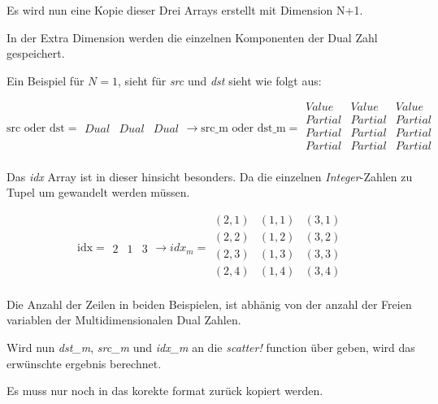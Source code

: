 Es wird nun eine Kopie dieser Drei Arrays erstellt mit Dimension N+1.

In der Extra Dimension werden die einzelnen Komponenten der Dual Zahl gespeichert.

Ein Beispiel für $N = 1$, sieht für \textit{src} und \textit{dst} sieht wie folgt aus:

$$

\text{src oder dst} = 

\begin{matrix}
Dual & Dual & Dual
\end{matrix}

\rightarrow

\text{src_m oder dst_m} = 

\begin{matrix}
Value   & Value   & Value   \\
Partial & Partial & Partial \\
Partial & Partial & Partial \\
Partial & Partial & Partial \\
\end{matrix}
$$

Das \textit{idx} Array ist in dieser hinsicht besonders.
Da die einzelnen \textit{Integer}-Zahlen zu Tupel um gewandelt werden müssen. 

$$

\text{idx}= 

\begin{matrix}
 2 & 1 & 3
\end{matrix}

\rightarrow

idx_m = 

\begin{matrix}
 (2, 1) & (1, 1) & (3, 1) \\ 
 (2, 2) & (1, 2) & (3, 2) \\
 (2, 3) & (1, 3) & (3, 3) \\
 (2, 4) & (1, 4) & (3, 4) \\
\end{matrix}
$$

Die Anzahl der Zeilen in beiden Beispielen, ist abhänig von der anzahl der Freien variablen  
der Multidimensionalen Dual Zahlen.

Wird nun \textit{dst_m}, \textit{src_m} und \textit{idx_m} an die \textit{scatter!} function über
geben, wird das erwünschte ergebnis berechnet. 

Es muss nur noch in das korekte format zurück kopiert werden. 

